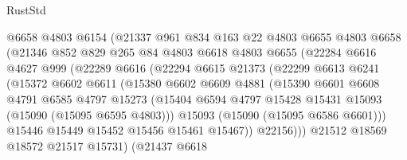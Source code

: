\begin{lexlean}{RustStd}
\begin{coremodule}
                    @6658
                    @4803
                    @6154
                    (@21337
                      @961
                      @834
                      @163
                      @22
                      @4803
                      @6655
                      @4803
                      @6658
                      (@21346
                        @852
                        @829
                        @265
                        @84
                        @4803
                        @6618
                        @4803
                        @6655
                        (@22284
                          @6616
                          @4627
                          @999
                          (@22289
                            @6616
                            (@22294
                              @6615
                              @21373
                              (@22299
                                @6613
                                @6241
                                (@15372
                                  @6602
                                  @6611
                                  (@15380
                                    @6602
                                    @6609
                                    @4881
                                    (@15390
                                      @6601
                                      @6608
                                      @4791
                                      @6585
                                      @4797
                                      @15273
                                      (@15404
                                        @6594
                                        @4797
                                        @15428
                                        @15431
                                        @15093
                                        (@15090 (@15095 @6595 @4803)))
                                      @15093
                                      (@15090 (@15095 @6586 @6601)))
                                    @15446
                                    @15449
                                    @15452
                                    @15456
                                    @15461
                                    @15467))
                                @22156)))
                          @21512
                          @18569
                          @18572
                          @21517
                          @15731)
                        (@21437
                          @6618

\end{coremodule}
\end{lexlean}
